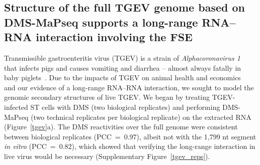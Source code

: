 \documentclass[main.tex]{subfiles}
\begin{document}
\subsection{Structure of the full TGEV genome based on DMS-MaPseq supports a long-range RNA--RNA interaction involving the FSE}

Transmissible gastroenteritis virus (TGEV) is a strain of \textit{Alphacoronavirus 1}~\cite{Whittaker2018} that infects pigs and causes vomiting and diarrhea -- almost always fatally in baby piglets~\cite{Liu2021}.
Due to the impacts of TGEV on animal health and economics~\cite{Liu2021} and our evidence of a long-range RNA--RNA interaction, we sought to model the genomic secondary structures of live TGEV.
We began by treating TGEV-infected ST cells with DMS (two biological replicates) and performing DMS-MaPseq (two technical replicates per biological replicate) on the extracted RNA (Figure~\ref{tgev}a).
The DMS reactivities over the full genome were consistent between biological replicates (PCC~=~0.97), albeit not with the 1,799 nt segment \textit{in vitro} (PCC~=~0.82), which showed that verifying the long-range interaction in live virus would be necessary (Supplementary Figure~\ref{tgev_reps}).
\end{document}
